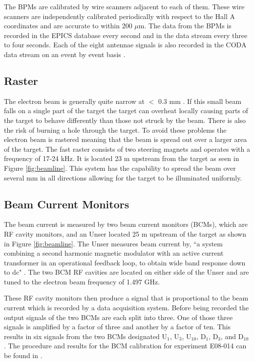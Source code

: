 The BPMs are calibrated by wire scanners adjacent to each of them. These wire scanners are independently calibrated periodically with respect to the Hall A coordinates and are accurate to within 200 $\mu$m. The data from the BPMs is recorded in the EPICS database every second and in the data stream every three to four seconds. Each of the eight antennae signals is also recorded in the CODA data stream on an event by event basis \cite{Thesis:Ye}. 

\subsection{Raster}
\label{ssec:raster}

The electron beam is generally quite narrow at $<$ 0.3 mm \cite{Thesis:Wang}. If this small beam falls on a single part of the target the target can overheat locally causing parts of the target to behave differently than those not struck by the beam. There is also the risk of burning a hole through the target. To avoid these problems the electron beam is rastered meaning that the beam is spread out over a larger area of the target. The fast raster consists of two steering magnets and operates with a frequency of 17-24 kHz. It is located 23 m upstream from the target \cite{Article:HallA} as seen in Figure \ref{fig:beamline}. This system has the capability to spread the beam over several mm in all directions allowing for the target to be illuminated uniformly. 

\subsection{Beam Current Monitors}
\label{ssec:bcms}

The beam current is measured by two beam current monitors (BCMs), which are RF cavity monitors, and an Unser located 25 m upstream of the target \cite{Article:HallA} as shown in Figure \ref{fig:beamline}. The Unser measures beam current by, ``a system combining a second harmonic magnetic modulator with an active current transformer in an operational feedback loop, to obtain wide band response down to dc" \cite{Article:Unser}. The two BCM RF cavities are located on either side of the Unser and are tuned to the electron beam frequency of 1.497 GHz. 

These RF cavity monitors then produce a signal that is proportional to the beam current which is recorded by a data acquisition system. Before being recorded the output signals of the two BCMs are each split into three. One of those three signals is amplified by a factor of three and another by a factor of ten. This results in six signals from the two BCMs designated U$_1$, U$_3$, U$_{10}$, D$_1$, D$_3$, and D$_{10}$. The procedure and results for the BCM calibration for experiment E08-014 can be found in \cite{bcm_calibration}. 

